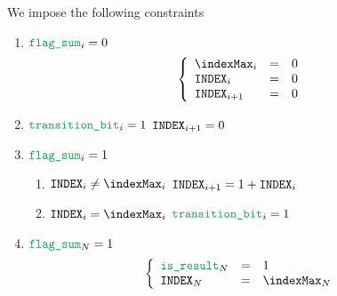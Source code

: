 We impose the following constraints
\begin{enumerate}
	\item \If $\locFlagSum _{i} = 0$ \Then
	      \[
		      \left\{ \begin{array}{lcl}
			      \indexMax _{i}     & = & 0 \\
                  \blsIndex _{i}     & = & 0 \\
                  \blsIndex _{i + 1} & = & 0 \\                
		      \end{array} \right.
	      \]
	\item \If $\locTransitionBit _{i} = 1$ \Then $\texttt{INDEX} _{i + 1} = 0$
	\item \If $\locFlagSum _{i} = 1$ \Then
	      \begin{enumerate}
		      \item \If $\blsIndex _{i} \neq \indexMax _{i}$ \Then $\texttt{INDEX} _{i + 1} = 1 + \texttt{INDEX} _{i}$
		      \item \If $\blsIndex _{i} =    \indexMax _{i}$ \Then $\locTransitionBit _{i} = 1$
	      \end{enumerate}
    \item \If $\locFlagSum _{N} = 1$ \Then
	      \[
		      \left\{ \begin{array}{lcl}
			      \locIsResult_{N} & = & 1             \\
			      \blsIndex_{N} & = & \indexMax_{N} \\
		      \end{array} \right.
	      \]
\end{enumerate}